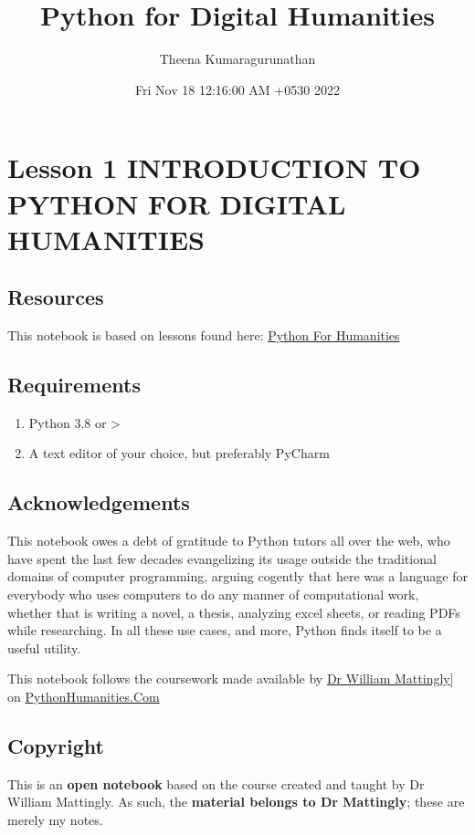\documentclass[11pt]{article}
\author{Theena Kumaragurunathan}
\date{Fri Nov 18 12:16:00 AM +0530 2022}
\title{Python for Digital Humanities}
\begin{document}
\maketitle
\tableofcontents


\section{Lesson 1 INTRODUCTION TO PYTHON FOR DIGITAL HUMANITIES}
\label{sec:org1642cb0}
\subsection{Resources}
\label{sec:orgc85fcd8}
This notebook is based on lessons found here: \href{https://pythonhumanities.com/}{Python For Humanities}
\subsection{Requirements}
\label{sec:org9658965}
\begin{enumerate}
\item Python 3.8 or >
\item A text editor of your choice, but preferably PyCharm
\end{enumerate}

\subsection{Acknowledgements}
\label{sec:org87ca611}
This notebook owes a debt of gratitude to Python tutors all over the web,
who have spent the last few decades evangelizing its usage outside the
traditional domains of computer programming, arguing cogently that here
was a language for everybody who uses computers to do any manner of
computational work, whether that is writing a novel, a thesis, analyzing
excel sheets, or reading PDFs while researching. In all these use cases,
and more, Python finds itself to be a useful utility.

This notebook follows the coursework made available by \href{https://datascience.si.edu/people/dr-william-mattingly}{Dr William Mattingly}] on \href{https://pythonhumanities.com/}{PythonHumanities.Com}
\subsection{Copyright}
\label{sec:orgef0710b}
This is an \textbf{open notebook} based on the course created and taught by Dr William Mattingly. As such, the \textbf{material belongs to Dr Mattingly}; these are merely my notes.
\end{document}
